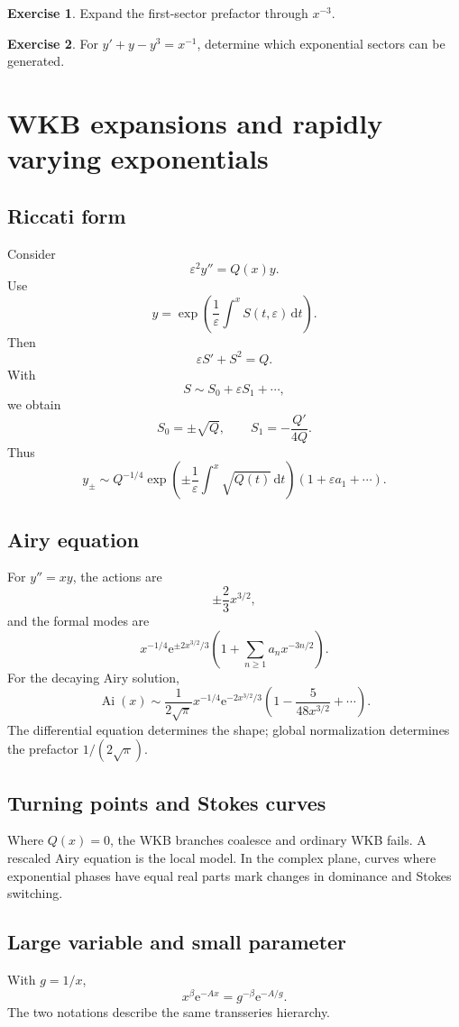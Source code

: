 \documentclass[11pt,oneside,openany]{book}
\newcommand{\Ai}{\operatorname{Ai}}
\newcommand{\e}{\mathrm{e}}
\newcommand{\dd}{\,\mathrm{d}}
\newcommand{\eps}{\varepsilon}
\theoremstyle{plain}
\theoremstyle{definition}
\newtheorem{exercise}{Exercise}[chapter]
\theoremstyle{remark}
\begin{document}
\begin{exercise}
Expand the first-sector prefactor through $x^{-3}$.
\end{exercise}

\begin{exercise}
For $y'+y-y^3=x^{-1}$, determine which exponential sectors can be generated.
\end{exercise}


\chapter{WKB expansions and rapidly varying exponentials}
\label{ch:wkb}

\section{Riccati form}
Consider
\[
  \eps^2y''=Q(x)y.
\]
Use
\[
  y=\exp\left(\frac1\eps\int^xS(t,\eps)\dd t\right).
\]
Then
\[
  \eps S'+S^2=Q.
\]
With
\[
  S\sim S_0+\eps S_1+\cdots,
\]
we obtain
\[
  S_0=\pm\sqrt Q,
  \qquad
  S_1=-\frac{Q'}{4Q}.
\]
Thus
\[
  y_\pm\sim Q^{-1/4}
  \exp\left(\pm\frac1\eps\int^x\sqrt{Q(t)}\dd t\right)
  (1+\eps a_1+\cdots).
\]

\section{Airy equation}
For $y''=xy$, the actions are
\[
  \pm\frac23x^{3/2},
\]
and the formal modes are
\[
  x^{-1/4}\e^{\pm2x^{3/2}/3}
  \left(1+\sum_{n\ge1}a_nx^{-3n/2}\right).
\]
For the decaying Airy solution,
\[
  \Ai(x)\sim\frac1{2\sqrt\pi}x^{-1/4}
  \e^{-2x^{3/2}/3}
  \left(1-\frac5{48x^{3/2}}+\cdots\right).
\]
The differential equation determines the shape; global normalization determines the prefactor $1/(2\sqrt\pi)$.

\section{Turning points and Stokes curves}
Where $Q(x)=0$, the WKB branches coalesce and ordinary WKB fails. A rescaled Airy equation is the local model. In the complex plane, curves where exponential phases have equal real parts mark changes in dominance and Stokes switching.

\section{Large variable and small parameter}
With $g=1/x$,
\[
  x^\beta\e^{-Ax}=g^{-\beta}\e^{-A/g}.
\]
The two notations describe the same transseries hierarchy.
\end{document}
